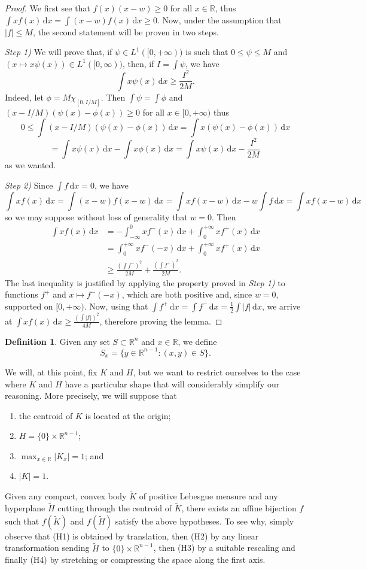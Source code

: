 \documentclass[12pt,reqno]{amsart}
\newcommand{\R}{\mathbb{R}}
\theoremstyle{plain}
\theoremstyle{definition}
\newtheorem{defi}[teor]{Definition}
\theoremstyle{remark}
\numberwithin{equation}{section}
\newcommand{\dx}[0]{\,\mathrm{d}x}
\begin{document}
\begin{proof}We first see that $f(x)(x-w)\geq 0$ for all $x\in\R$, thus $\int xf(x)\dx=\int (x-w)f(x)\dx\geq 0$. Now, under the assumption that $|f|\leq M$, the second statement will be proven in two steps.

\textit{Step 1)} We will prove that, if $\psi\in L^1([0,+\infty))$ is such that $0\leq \psi\leq M$ and $(x\mapsto x \psi(x))\in L^1([0,\infty))$, then, if $I=\int \psi$, we have $$\int x \psi(x)\dx\geq  \frac{I^2}{2M}.$$ Indeed, let $\phi=M\chi_{[0,I/M]}$. Then $\int \psi=\int\phi$ and $(x-I/M)(\psi(x)-\phi(x))\geq 0$ for all $x\in[0,+\infty)$ thus
$$0\leq \int (x-I/M)(\psi(x)-\phi(x))\dx=\int x(\psi(x)-\phi(x))\dx$$$$=\int x\psi(x)\dx-\int x\phi(x)\dx=\int x\psi(x)\dx-\frac{I^2}{2M}\,$$
as we wanted.

\textit{Step 2)} Since $\int f\dx=0$, we have$$\int xf(x)\dx =\int (x-w)f(x-w)\dx =\int xf(x-w)\dx-w\int f\dx = \int xf(x-w)\dx$$ so we may suppose without loss of generality that $w=0$. Then \begin{align*}
    \int xf(x)\dx&=-\int_{-\infty}^0xf^-(x)\dx+\int_0^{+\infty}xf^+(x)\dx\\
    &=\int_0^{+\infty}xf^-(-x)\dx+\int_0^{+\infty}xf^+(x)\dx\\
    &\geq\frac{(\int f^-)^2}{2M}+\frac{(\int f^+)^2}{2M}.
\end{align*}
The last inequality is justified by applying the property proved in \textit{Step 1)} to functions $f^+$ and $x\mapsto f^-(-x)$, which are both positive and, since $w=0$, supported on $[0, +\infty)$. Now, using that $\int f^+\dx=\int f^-\dx=\frac 12\int |f|\dx$, we arrive at $\int xf(x)\dx\geq \frac{(\int |f|)^2}{4M}$, therefore proving the lemma.\end{proof}

\begin{defi}
    Given any set $S\subset \mathbb{R}^n$ and $x\in\mathbb{R}$, we define $$S_x=\{y\in\mathbb{R}^{n-1}:(x,y)\in S\}.$$
\end{defi}

We will, at this point, fix $K$ and $H$, but we want to restrict ourselves to the case where $K$ and $H$ have a particular shape that will considerably simplify our reasoning. More precisely, we will suppose that
\begin{enumerate}
    \item [(H1)] the centroid of $K$ is located at the origin;
    \item [(H2)] $H=\{0\}\times \mathbb{R}^{n-1}$;
    \item [(H3)] $\max_{x\in\mathbb{R}}|K_x|=1$; and
    \item [(H4)] $|K|=1$.    
\end{enumerate}
Given any compact, convex body $\tilde K$ of positive Lebesgue measure and any hyperplane $\tilde H$ cutting through the centroid of $\tilde K$, there exists an affine bijection $f$ such that $f(\tilde K)$ and $f(\tilde H)$ satisfy the above hypotheses. To see why, simply observe that (H1) is obtained by translation, then (H2) by any linear transformation sending $\tilde H$ to $\{0\}\times\mathbb{R}^{n-1}$, then (H3) by a suitable rescaling and finally (H4) by stretching or compressing the space along the first axis.
\end{document}
